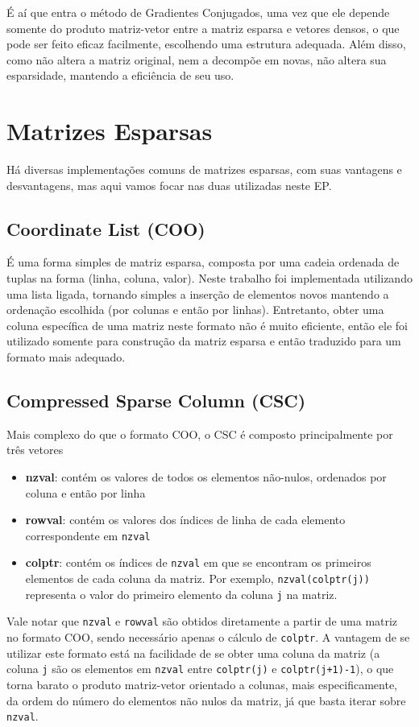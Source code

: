 \documentclass[a4paper,11pt]{article}
\begin{document}
    É aí que entra o método de Gradientes Conjugados, uma vez que ele depende somente do
    produto matriz-vetor entre a matriz esparsa e vetores densos, o que pode ser feito
    eficaz facilmente, escolhendo uma estrutura adequada. Além disso, como não altera
    a matriz original, nem a decompõe em novas, não altera sua esparsidade, mantendo
    a eficiência de seu uso.

    \section*{Matrizes Esparsas}
    Há diversas implementações comuns de matrizes esparsas, com suas vantagens e desvantagens,
    mas aqui vamos focar nas duas utilizadas neste EP.

    \subsection*{Coordinate List (COO)}
    É uma forma simples de matriz esparsa, composta por uma cadeia ordenada de tuplas na forma
    (linha, coluna, valor). Neste trabalho foi implementada utilizando uma lista ligada,
    tornando simples a inserção de elementos novos mantendo a ordenação escolhida (por colunas
    e então por linhas).
    Entretanto, obter uma coluna específica de uma matriz neste formato não é muito eficiente,
    então ele foi utilizado somente para construção da matriz esparsa e então traduzido
    para um formato mais adequado.

    \subsection*{Compressed Sparse Column (CSC)}
    Mais complexo do que o formato COO, o CSC é composto principalmente por três vetores

    \begin{itemize}
        \item \textbf{nzval}: contém os valores de todos os elementos não-nulos, ordenados por
        coluna e então por linha
        \item \textbf{rowval}: contém os valores dos índices de linha de cada elemento correspondente em \texttt{nzval}
        \item \textbf{colptr}: contém os índices de \texttt{nzval} em que se encontram os primeiros elementos de cada coluna da matriz. Por exemplo, \texttt{nzval(colptr(j))} representa
        o valor do primeiro elemento da coluna \texttt{j} na matriz.
    \end{itemize}
    Vale notar que \texttt{nzval} e \texttt{rowval} são obtidos diretamente a partir de uma matriz no formato COO, sendo necessário apenas o cálculo de \texttt{colptr}.
    A vantagem de se utilizar este formato está na facilidade de se obter uma coluna da matriz (a coluna \texttt{j} são os elementos em \texttt{nzval} entre \texttt{colptr(j)} e \texttt{colptr(j+1)-1}), o que torna barato o produto matriz-vetor orientado a colunas, mais especificamente, da ordem do número do elementos não nulos da matriz, já que basta iterar sobre \texttt{nzval}.
\end{document}
